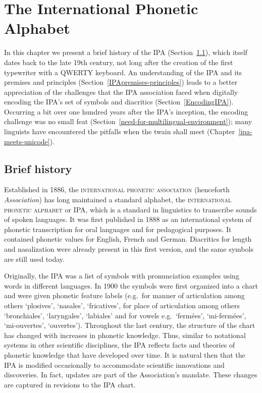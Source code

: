 \chapter{The International Phonetic Alphabet}
\label{the-international-phonetic-alphabet}

In this chapter we present a brief history of the IPA 
(Section~\ref{IPAhistory}), which itself dates 
back to the late 19th century, not long after the creation of the first 
typewriter with a QWERTY 
keyboard. An understanding of the IPA and its premises and principles 
(Section~\ref{IPApremises-principles}) leads to a better 
appreciation of the challenges that the IPA association 
faced when digitally encoding the IPA's set of symbols and 
diacritics (Section~\ref{EncodingIPA}). Occurring a bit over one hundred 
years after the IPA's inception, the encoding challenge was no small feat 
(Section~\ref{need-for-multilingual-environment}); many 
linguists have encountered the pitfalls when the twain shall meet 
(Chapter~\ref{ipa-meets-unicode}).

\section{Brief history}
\label{IPAhistory}

Established in 1886, the \textsc{international phonetic association} (henceforth
\textit{Association}) has long maintained a standard alphabet, the
\textsc{international phonetic alphabet} or IPA, which is a
standard in linguistics to transcribe sounds of spoken languages. It was
first published in 1888 as an international system of phonetic transcription for
oral languages and for pedagogical purposes. It contained phonetic values for
English, French and German. Diacritics for length and nasalization were already
present in this first version, and the same symbols are still used today. 

Originally, the IPA was a list of symbols with pronunciation examples
using words in different languages. In 1900 the symbols were first organized into
a chart and were given phonetic feature labels (e.g.\ for manner of
articulation among others `plosives', `nasales', `fricatives', for place of
articulation among others `bronchiales', `laryngales', `labiales' and for vowels
e.g.\ `fermées', `mi-fermées', `mi-ouvertes', `ouvertes'). Throughout the last
century, the structure of the chart has changed with increases in phonetic
knowledge. Thus, similar to notational systems in other scientific disciplines,
the IPA reflects facts and theories of phonetic knowledge that have developed
over time. It is natural then that the IPA is modified occasionally to
accommodate scientific innovations and discoveries. In fact, updates are part of the
Association's mandate. These changes are captured in revisions to the IPA chart.

